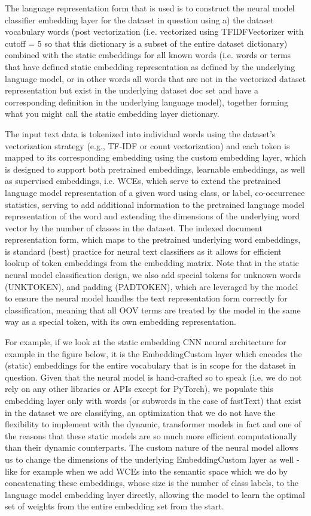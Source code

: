 \documentclass[final]{clv2025}
\begin{document}
The language representation form that is used is to construct the neural model classifier embedding layer for the dataset in question using a) the dataset vocabulary words (post vectorization (i.e. vectorized using TFIDFVectorizer with cutoff = 5 so that this dictionary is a subset of the entire dataset dictionary) combined with the static embeddings for all known words (i.e. words or terms that have defined static embedding representation as defined by the underlying language model, or in other words all words that are not in the vectorized dataset representation but exist in the underlying dataset doc set and have a corresponding definition in the underlying language model), together forming what you might call the static embedding layer dictionary. 

The input text data is tokenized into individual words using the dataset's vectorization strategy (e.g., TF-IDF or count vectorization) and each token is mapped to its corresponding embedding using the custom embedding layer, which is designed to support both pretrained embeddings, learnable embeddings, as well as supervised embeddings, i.e. WCEs, which serve to extend the pretrained language model representation of a given word using class, or label, co-occurrence statistics, serving to add additional information to the pretrained language model representation of the word and extending the dimensions of the underlying word vector by the number of classes in the dataset. The indexed document representation form, which maps to the pretrained underlying word embeddings, is standard (best) practice for neural text classifiers as it allows for efficient lookup of token embeddings from the embedding matrix. Note that in the static neural model classification design, we also add special tokens for unknown words (UNKTOKEN), and padding (PADTOKEN), which are leveraged by the model to ensure the neural model handles the text representation form correctly for classification, meaning that all OOV terms are treated by the model in the same way as a special token, with its own embedding representation. 

For example, if we look at the static embedding CNN neural architecture for example in the figure below, it is the EmbeddingCustom layer which encodes the (static) embeddings for the entire vocabulary that is in scope for the dataset in question. Given that the neural model is hand-crafted so to speak (i.e. we do not rely on any other libraries or APIs except for PyTorch), we populate this embedding layer only with words (or subwords in the case of fastText) that exist in the dataset we are classifying, an optimization that we do not have the flexibility to implement with the dynamic, transformer models in fact and one of the reasons that these static models are so much more efficient computationally than their dynamic counterparts. The custom nature of the neural model allows us to change the dimensions of the underlying EmbeddingCustom layer as well - like for example when we add WCEs into the semantic space which we do by concatenating these embeddings, whose size is the number of class labels, to the language model embedding layer directly, allowing the model to learn the optimal set of weights from the entire embedding set from the start.
\end{document}
